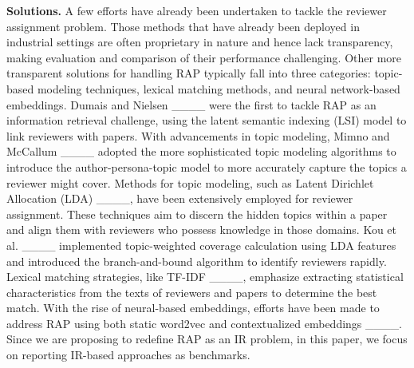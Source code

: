 \textbf{Solutions.}
A few efforts have already been undertaken to tackle the reviewer assignment problem. Those methods that have already been deployed in industrial settings are often proprietary in nature and hence lack transparency, making evaluation and comparison of their performance challenging. Other more transparent solutions for handling RAP typically fall into three categories: topic-based modeling techniques, lexical matching methods, and neural network-based embeddings.
Dumais and Nielsen ____ were the first to tackle RAP as an information retrieval challenge, using the latent semantic indexing (LSI) model to link reviewers with papers. With advancements in topic modeling, Mimno and McCallum ____ adopted the more sophisticated topic modeling algorithms to introduce the author-persona-topic model to more accurately capture the topics a reviewer might cover. Methods for topic modeling, such as Latent Dirichlet Allocation (LDA) ____, have been extensively employed for reviewer assignment. These techniques aim to discern the hidden topics within a paper and align them with reviewers who possess knowledge in those domains. Kou et al. ____ implemented topic-weighted coverage calculation using LDA features and introduced the branch-and-bound algorithm to identify reviewers rapidly.
Lexical matching strategies, like TF-IDF ____, emphasize extracting statistical characteristics from the texts of reviewers and papers to determine the best match. With the rise of neural-based embeddings, efforts have been made to address RAP using both static word2vec and contextualized embeddings ____. %
Since we are proposing to redefine RAP as an IR problem, in this paper, we focus on reporting IR-based approaches as benchmarks. %


